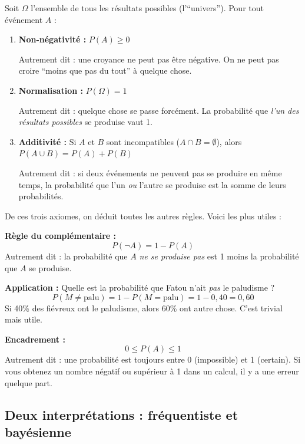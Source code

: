 \documentclass[11pt,a4paper]{article}
\begin{document}
\begin{theorembox}
Soit $\Omega$ l'ensemble de tous les résultats possibles (l'``univers''). Pour tout événement $A$ :
\begin{enumerate}
    \item \textbf{Non-négativité :} $P(A) \geq 0$
    
    Autrement dit  : une croyance ne peut pas être négative. On ne peut pas croire ``moins que pas du tout'' à quelque chose.
    
    \item \textbf{Normalisation :} $P(\Omega) = 1$
    
    Autrement dit  : quelque chose se passe forcément. La probabilité que \textit{l'un des résultats possibles} se produise vaut 1.
    
    \item \textbf{Additivité :} Si $A$ et $B$ sont incompatibles ($A \cap B = \emptyset$), alors $P(A \cup B) = P(A) + P(B)$
    
    Autrement dit  : si deux événements ne peuvent pas se produire en même temps, la probabilité que l'un \textit{ou} l'autre se produise est la somme de leurs probabilités.
\end{enumerate}
\end{theorembox}

De ces trois axiomes, on déduit toutes les autres règles. Voici les plus utiles :

\begin{exemplebox}
\textbf{Règle du complémentaire :}
$$P(\neg A) = 1 - P(A)$$
Autrement dit  : la probabilité que $A$ \textit{ne se produise pas} est 1 moins la probabilité que $A$ se produise.

\textbf{Application :} Quelle est la probabilité que Fatou n'ait \textit{pas} le paludisme ?
$$P(M \neq \text{palu}) = 1 - P(M = \text{palu}) = 1 - 0{,}40 = 0{,}60$$
Si 40\% des fiévreux ont le paludisme, alors 60\% ont autre chose. C'est trivial mais utile.

\textbf{Encadrement :}
$$0 \leq P(A) \leq 1$$
Autrement dit  : une probabilité est toujours entre 0 (impossible) et 1 (certain). Si vous obtenez un nombre négatif ou supérieur à 1 dans un calcul, il y a une erreur quelque part.
\end{exemplebox}

\subsection{Deux interprétations : fréquentiste et bayésienne}
\end{document}
